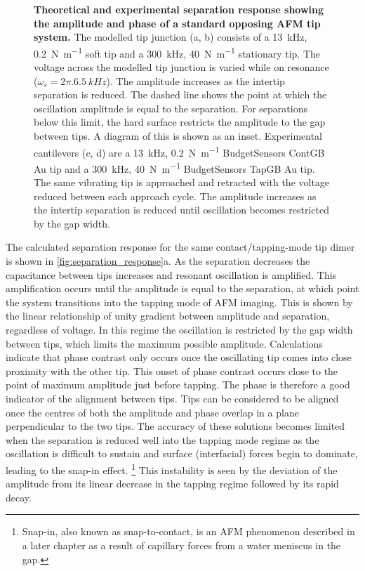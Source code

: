 \documentclass{article}
\begin{document}
\begin{figure}[bt]
{\caption[Theoretical and experimental separation response showing the amplitude and phase of a standard opposing AFM tip system]{\textbf{Theoretical and experimental separation response showing the amplitude and phase of a standard opposing AFM tip system.} The modelled tip junction (a, b) consists of a \SI{13}{kHz}, \SI{0.2}{N.m^{-1}} soft tip and a \SI{300}{kHz}, \SI{40}{N.m^{-1}} stationary tip. The voltage across the modelled tip junction is varied while on resonance ($\omega_s = 2\pi.\SI{6.5}{kHz}$). The amplitude increases as the intertip separation is reduced. The dashed line shows the point at which the oscillation amplitude is equal to the separation. For separations below this limit, the hard surface restricts the amplitude to the gap between tips. A diagram of this is shown as an inset. Experimental cantilevers (c, d) are a \SI{13}{kHz}, \SI{0.2}{N.m^{-1}} BudgetSensors ContGB Au tip and a \SI{300}{kHz}, \SI{40}{N.m^{-1}} BudgetSensors TapGB Au tip. The same vibrating tip is approached and retracted with the voltage reduced between each approach cycle. The amplitude increases as the intertip separation is reduced until oscillation becomes restricted by the gap width.}
\label{fig:separation_response}}
\end{figure}

The calculated separation response for the same contact/tapping-mode tip dimer is shown in \autoref{fig:separation_response}a. As the separation decreases the capacitance between tips increases and resonant oscillation is amplified. This amplification occurs until the amplitude is equal to the separation, at which point the system transitions into the tapping mode of AFM imaging. This is shown by the linear relationship of unity gradient between amplitude and separation, regardless of voltage. In this regime the oscillation is restricted by the gap width between tips, which limits the maximum possible amplitude.
Calculations indicate that phase contrast only occurs once the oscillating tip comes into close proximity with the other tip. This onset of phase contrast occurs close to the point of maximum amplitude just before tapping. The phase is therefore a good indicator of the alignment between tips. Tips can be considered to be aligned once the centres of both the amplitude and phase overlap in a plane perpendicular to the two tips. The accuracy of these solutions becomes limited when the separation is reduced well into the tapping mode regime as the oscillation is difficult to sustain and surface (interfacial) forces begin to dominate, leading to the snap-in effect.%
\footnote{Snap-in, also known as snap-to-contact, is an AFM phenomenon described in a later chapter as a result of capillary forces from a water meniscus in the gap.}
This instability is seen by the deviation of the amplitude from its linear decrease in the tapping regime followed by its rapid decay.
\end{document}
